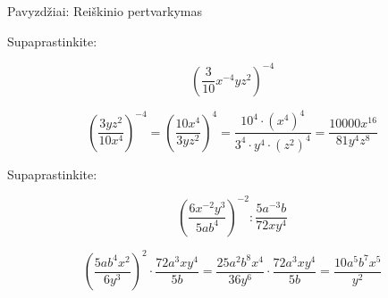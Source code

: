 \documentclass[aspectratio=169,10pt]{beamer}
\begin{document}
\begin{frame}{Pavyzdžiai: Reiškinio pertvarkymas}

    \small

    \begin{example}[3]

        Supaprastinkite:

        \[
        \left(
        \frac{3}{10}x^{-4}yz^2
        \right)^{-4}
        \]

        \[
        \left(
        \frac{3yz^2}{10x^4}
        \right)^{-4}
        =
        \left(
        \frac{10x^4}{3yz^2}
        \right)^4
        =
        \frac{
        10^4\cdot(x^4)^4
        }{
        3^4\cdot y^4\cdot(z^2)^4
        }
        =
        \frac{10000x^{16}}
        {81y^4z^8}
        \]

    \end{example}

    \begin{example}[4]

        Supaprastinkite:

        \[
        \left(
        \frac{6x^{-2}y^3}{5ab^4}
        \right)^{-2}
        :
        \frac{5a^{-3}b}{72xy^4}
        \]

        \[
        \left(
        \frac{5ab^4x^2}{6y^3}
        \right)^2
        \cdot
        \frac{72a^3xy^4}{5b}
        =
        \frac{25a^2b^8x^4}{36y^6}
        \cdot
        \frac{72a^3xy^4}{5b}
        =
        \frac{10a^5b^7x^5}{y^2}
        \]

    \end{example}

\end{frame}

\end{document}
